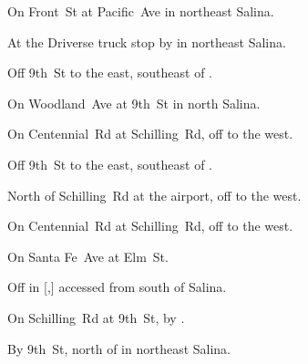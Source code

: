 

\begin{LocationList}

On Front~St at Pacific~Ave in northeast Salina.

At the Driverse truck stop by   in northeast Salina.

Off 9th~St to the east, southeast of  .

On Woodland~Ave at 9th~St in north Salina.

On Centennial~Rd at Schilling~Rd, off   to the west.

\Location{\GarageHQ \Garage}
Off 9th~St to the east, southeast of  .

North of Schilling~Rd at the airport, off   to the west.

\Location{\RecruitmentAgency \Recruitment}
On Centennial~Rd at Schilling~Rd, off   to the west.

On Santa Fe~Ave at Elm~St.

Off  in [,] accessed from  south of Salina.

On Schilling~Rd at 9th~St, by  .

By  9th~St, north of   in northeast Salina.

\end{LocationList}

